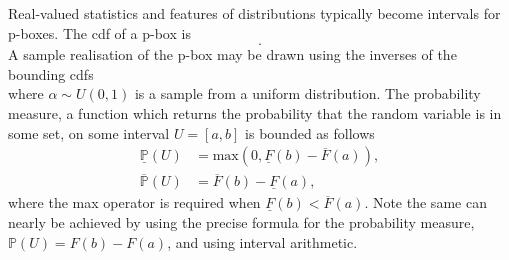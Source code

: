 \documentclass{juliacon}
\begin{document}
Real-valued statistics and features of distributions typically become intervals for p-boxes. The cdf of a p-box is
\begin{equation*}
  [\underline{F}(x), \overline{F}(x)] .
\end{equation*}
\noindent A sample realisation of the p-box may be drawn using the inverses of the bounding cdfs
\begin{equation*}
  [\overline{F}^{-1}(\alpha), \underline{F}^{-1}(\alpha)]
\end{equation*}
\noindent where $\alpha \sim U(0,1)$ is a sample from a uniform distribution. The probability measure,  a function which returns the probability that the random variable is in some set, on some interval $U = [a, b]$ is bounded as follows
\begin{align*}
  \underline{\mathbb{P}}(U) &= \text{max}(0, \underline{F}(b) - \overline{F}(a)),\\ 
  \overline{\mathbb{P}}(U)  &= \overline{F}(b) - \underline{F}(a),
\end{align*}
\noindent where the max operator is required when $\underline{F}(b) < \overline{F}(a)$. Note the same can nearly be achieved by using the precise formula for the probability measure, $\mathbb{P}(U) = F(b)- F(a)$, and using interval arithmetic.
\end{document}
